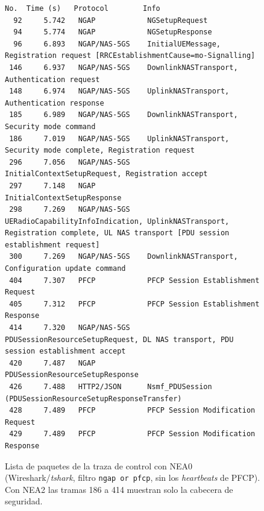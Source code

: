 \documentclass[conference]{IEEEtran}
\begin{document}
\begin{figure}[!t]
\begin{lstlisting}[basicstyle=\ttfamily\fontsize{6.2}{7.2}\selectfont]
 No.  Time (s)   Protocol        Info
  92     5.742   NGAP            NGSetupRequest
  94     5.774   NGAP            NGSetupResponse
  96     6.893   NGAP/NAS-5GS    InitialUEMessage, Registration request [RRCEstablishmentCause=mo-Signalling]
 146     6.937   NGAP/NAS-5GS    DownlinkNASTransport, Authentication request
 148     6.974   NGAP/NAS-5GS    UplinkNASTransport, Authentication response
 185     6.989   NGAP/NAS-5GS    DownlinkNASTransport, Security mode command
 186     7.019   NGAP/NAS-5GS    UplinkNASTransport, Security mode complete, Registration request
 296     7.056   NGAP/NAS-5GS    InitialContextSetupRequest, Registration accept
 297     7.148   NGAP            InitialContextSetupResponse
 298     7.269   NGAP/NAS-5GS    UERadioCapabilityInfoIndication, UplinkNASTransport, Registration complete, UL NAS transport [PDU session establishment request]
 300     7.269   NGAP/NAS-5GS    DownlinkNASTransport, Configuration update command
 404     7.307   PFCP            PFCP Session Establishment Request
 405     7.312   PFCP            PFCP Session Establishment Response
 414     7.320   NGAP/NAS-5GS    PDUSessionResourceSetupRequest, DL NAS transport, PDU session establishment accept
 420     7.487   NGAP            PDUSessionResourceSetupResponse
 426     7.488   HTTP2/JSON      Nsmf_PDUSession (PDUSessionResourceSetupResponseTransfer)
 428     7.489   PFCP            PFCP Session Modification Request
 429     7.489   PFCP            PFCP Session Modification Response
\end{lstlisting}
\caption{Lista de paquetes de la traza de control con NEA0 (Wireshark/\textit{tshark}, filtro \texttt{ngap or pfcp}, sin los \textit{heartbeats} de PFCP). Con NEA2 las tramas 186 a 414 muestran solo la cabecera de seguridad.}
\label{fig:lista}
\end{figure}
\end{document}
